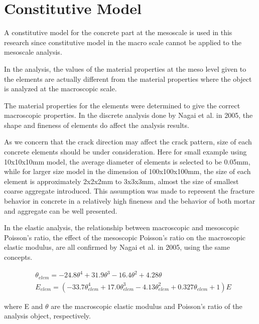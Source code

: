 \section{Constitutive Model}

A constitutive model for the concrete part at the mesoscale is used in this research since constitutive model in the macro scale cannot be applied to the mesoscale analysis.

In the analysis, the values of the material properties at the meso level given to the elements are actually different from the material properties where the object is analyzed at the macroscopic scale.

The material properties for the elements were determined to give the correct macroscopic properties.  In the discrete analysis done by Nagai et al. in 2005\cite{Nagai}, the shape and fineness of elements do affect the analysis results.

As we concern that the crack direction may affect the crack pattern, size of each concrete elements should be under consideration. Here for small example using 10x10x10mm model, the average diameter of elements is selected to be 0.05mm, while for larger size model in the dimension of 100x100x100mm, the size of each element is approximately 2x2x2mm to 3x3x3mm, almost the size of smallest coarse aggregate introduced. This assumption was made to represent the fracture behavior in concrete in a relatively high fineness and the behavior of both mortar and aggregate can be well presented.

In the elastic analysis, the relationship between macroscopic and mesoscopic Poisson's ratio, the effect of the mesoscopic Poisson's ratio on the macroscopic elastic modulus, are all confirmed by Nagai et al. in 2005\cite{Nagai}, using the same concepts.

\begin{equation}
  \begin{aligned}
  &\theta_{elem} = -24.8\theta^4+31.9\theta^3-16.4\theta^2 +4.28\theta\\
  &E_{elem} = (-33.7\theta_{elem}^4 + 17.0\theta_{elem}^3 - 4.13\theta_{elem}^2 + 0.327\theta_{elem} + 1)E
  \end{aligned}
\end{equation}

where E and $\theta$ are the macroscopic elastic modulus and Poisson's ratio of the analysis object, respectively.

